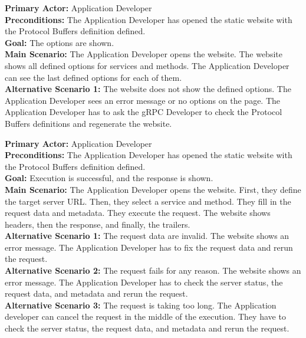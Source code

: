 
\textbf{Primary Actor:} Application Developer\\
\textbf{Preconditions:} The Application Developer has opened the static website with the Protocol Buffers definition defined.\\
\textbf{Goal:} The options are shown.\\
\textbf{Main Scenario:}
The Application Developer opens the website.
The website shows all defined options for services and methods.
The Application Developer can see the last defined options for each of them.\\
\textbf{Alternative Scenario 1:}
The website does not show the defined options.
The Application Developer sees an error message or no options on the page.
The Application Developer has to ask the gRPC Developer to check the Protocol Buffers definitions and regenerate the website.


\textbf{Primary Actor:} Application Developer\\
\textbf{Preconditions:} The Application Developer has opened the static website with the Protocol Buffers definition defined.\\
\textbf{Goal:} Execution is successful, and the response is shown.\\
\textbf{Main Scenario:}
The Application Developer opens the website.
First, they define the target server URL\@.
Then, they select a service and method.
They fill in the request data and metadata.
They execute the request.
The website shows headers, then the response, and finally, the trailers.\\
\textbf{Alternative Scenario 1:}
The request data are invalid.
The website shows an error message.
The Application Developer has to fix the request data and rerun the request.\\
\textbf{Alternative Scenario 2:}
The request fails for any reason.
The website shows an error message.
The Application Developer has to check the server status, the request data, and metadata and rerun the request.\\
\textbf{Alternative Scenario 3:}
The request is taking too long.
The Application developer can cancel the request in the middle of the execution.
They have to check the server status, the request data, and metadata and rerun the request.


